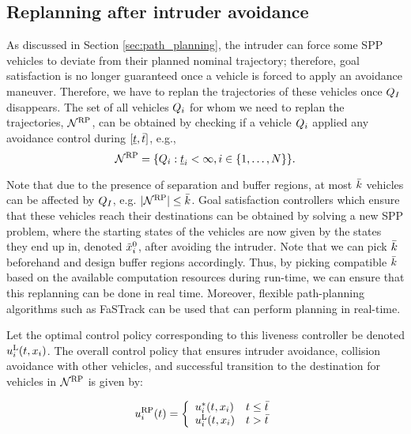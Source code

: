 \subsection{Replanning after intruder avoidance} \label{sec:replan}
As discussed in Section \ref{sec:path_planning}, the intruder can force some SPP vehicles to deviate from their planned nominal trajectory; therefore, goal satisfaction is no longer guaranteed once a vehicle is forced to apply an avoidance maneuver. Therefore, we have to replan the trajectories of these vehicles once $Q_{I}$ disappears. The set of all vehicles $Q_i$ for whom we need to replan the trajectories, $\mathcal{N}^\text{RP}$, can be obtained by checking if a vehicle $Q_i$ applied any avoidance control during $[\underline{t}, \bar{t}]$, e.g.,
\begin{equation} \label{eq:RVS}
\rvs = \{\veh_i: \tsa_i < \infty, i \in \{1, \ldots, \N \} \}. 
\end{equation}  

Note that due to the presence of separation and buffer regions, at most $\bar{k}$ vehicles can be affected by $Q_{I}$, e.g. $|\mathcal{N}^\text{RP}| \leq \bar{k}$. Goal satisfaction controllers which ensure that these vehicles reach their destinations can be obtained by solving a new SPP problem, where the starting states of the vehicles are now given by the states they end up in, denoted $\tilde{x}_i^0$, after avoiding the intruder. Note that we can pick $\bar{k}$ beforehand and design buffer regions accordingly. Thus, by picking compatible $\bar{k}$ based on the available computation resources during run-time, we can ensure that this replanning can be done in real time. Moreover, flexible path-planning algorithms such as FaSTrack \cite{herbert2017fastrack} can be used that can perform planning in real-time.   

Let the optimal control policy corresponding to this liveness controller be denoted ${u^{\text{L}}_{i}}(t, x_i)$. The overall control policy that ensures intruder avoidance, collision avoidance with other vehicles, and successful transition to the destination for vehicles in $\mathcal{N}^\text{RP}$ is given by:

\begin{equation} \label{eqn:full_controller}
\ctrl_i^{\text{RP}}(t) = 
\left \{ 
\begin{array}{ll}
{\ctrl^*_{i}}(t, \state_i) & t \leq \tea\\
{\ctrl^{\text{L}}_{i}}(t, \state_i) & t > \tea
\end{array}
\right.
\end{equation}

